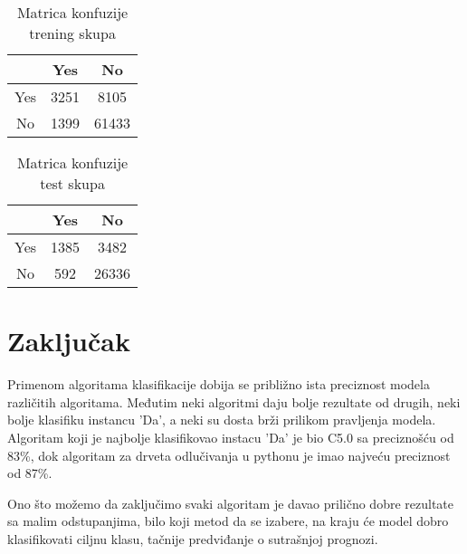 \documentclass[a4paper]{article}
\begin{document}
        \begin{table}[H]
        \begin{center}
        \caption{Matrica konfuzije trening skupa}
        \label{tab:NN-trening-CM}
        \begin{tabular}{|c|c|c|} \hline
        \textbf{} & \textbf{Yes} & \textbf{No} \\ \hline
        Yes &  3251&  8105  \\ \hline
        No &  1399 &61433 \\ \hline
        \end{tabular}
        \end{center}
        \end{table}
        
        \begin{table}[H]
        \begin{center}
        \caption{Matrica konfuzije test skupa}
        \label{tab:NN-test-CM}
        \begin{tabular}{|c|c|c|} \hline
        \textbf{} & \textbf{Yes} & \textbf{No} \\ \hline
        Yes & 1385 & 3482  \\ \hline
        No & 592 & 26336 \\ \hline
        \end{tabular}
        \end{center}
        \end{table}

\newpage
\section{Zaključak}
\label{sec:zakljucak}

Primenom algoritama klasifikacije dobija se približno ista preciznost modela različitih algoritama. Međutim neki algoritmi daju bolje rezultate od drugih, neki bolje klasifiku instancu 'Da', a neki su dosta brži prilikom pravljenja modela. Algoritam koji je najbolje klasifikovao instacu 'Da' je bio C5.0 sa preciznošću od 83\%, dok algoritam za drveta odlučivanja u pythonu je imao najveću preciznost od 87\%.\par
Ono što možemo da zaključimo svaki algoritam je davao prilično dobre rezultate sa malim odstupanjima, bilo koji metod da se izabere, na kraju će model dobro klasifikovati ciljnu klasu, tačnije predviđanje o sutrašnjoj prognozi.


\newpage
{}
\appendix
 

\end{document}
